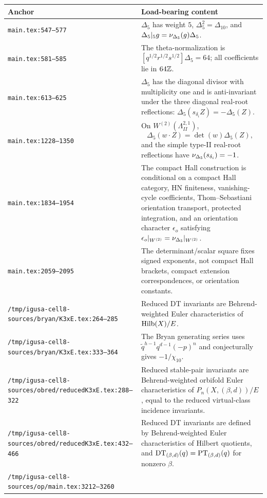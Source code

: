 \begin{center}
\small
\begin{tabular}{p{}p{}}
\hline
Anchor & Load-bearing content \\
\hline
\texttt{main.tex:547--577} &
\(\Delta_5\) has weight \(5\), \(\Delta_5^2=\Delta_{10}\), and
\(\Delta_5|_5g=\nu_{\Delta_5}(g)\Delta_5\). \\
\texttt{main.tex:581--585} &
The theta-normalization is
\([q^{1/2}r^{1/2}s^{1/2}]\Delta_5=64\); all coefficients lie in
\(64\mathbb Z\). \\
\texttt{main.tex:613--625} &
\(\Delta_5\) has the diagonal divisor with multiplicity one and is
anti-invariant under the three diagonal real-root reflections:
\(\Delta_5(s_{\delta_i}Z)=-\Delta_5(Z)\). \\
\texttt{main.tex:1228--1350} &
On \(W^{(2)}(\Lambda^{2,1}_{II})\),
\[
  \Delta_5(w\cdot Z)=\det(w)\Delta_5(Z),
\]
and the simple type-II real-root reflections have
\(\nu_{\Delta_5}(s_{\delta_i})=-1\). \\
\texttt{main.tex:1834--1954} &
The compact Hall construction is conditional on a compact Hall category,
HN finiteness, vanishing-cycle coefficients, Thom--Sebastiani
orientation transport, protected integration, and an orientation
character \(\epsilon_o\) satisfying
\(\epsilon_o|_{W^{(2)}}=\nu_{\Delta_5}|_{W^{(2)}}\). \\
\texttt{main.tex:2059--2095} &
The determinant/scalar square fixes signed exponents, not compact Hall
brackets, compact extension correspondences, or orientation constants. \\
\texttt{/tmp/igusa-cell8-sources/bryan/K3xE.tex:264--285} &
Reduced DT invariants are Behrend-weighted Euler characteristics of
\(\operatorname{Hilb}(X)/E\). \\
\texttt{/tmp/igusa-cell8-sources/bryan/K3xE.tex:333--364} &
The Bryan generating series uses
\(\widetilde q^{h-1}q^{d-1}(-p)^n\) and conjecturally gives
\(-1/\chi_{10}\). \\
\texttt{/tmp/igusa-cell8-sources/obred/reducedK3xE.tex:288--322} &
Reduced stable-pair invariants are Behrend-weighted orbifold Euler
characteristics of \(P_n(X,(\beta,d))/E\), equal to the reduced
virtual-class incidence invariants. \\
\texttt{/tmp/igusa-cell8-sources/obred/reducedK3xE.tex:432--466} &
Reduced DT invariants are defined by Behrend-weighted Euler
characteristics of Hilbert quotients, and
\(\mathrm{DT}_{(\beta,d)}(q)=\mathrm{PT}_{(\beta,d)}(q)\) for nonzero \(\beta\). \\
\texttt{/tmp/igusa-cell8-sources/op/main.tex:3212--3260} &

\end{tabular}
\end{center}
